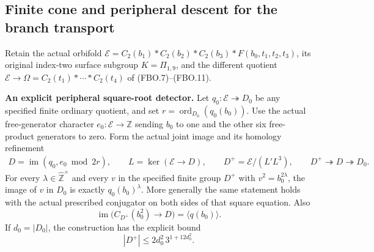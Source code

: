\subsection{Finite cone and peripheral descent for the branch transport}

Retain the actual orbifold
$\mathcal E=C_2(b_1)*C_2(b_2)*C_2(b_3)*
F(b_0,t_1,t_2,t_3)$, its original index-two surface subgroup
$K=\Pi_{1,9}$, and the different quotient
$\mathcal E\to\Omega=C_2(t_1)*\cdots*C_2(t_4)$
of (FBO.7)--(FBO.11).

\par\medskip\noindent\textbf{An explicit peripheral square-root detector.}\quad
Let $q_0:\mathcal E\twoheadrightarrow D_0$ be any specified
finite ordinary quotient, and set
$r=\operatorname{ord}_{D_0}(q_0(b_0))$.
Use the actual free-generator character
$e_0:\mathcal E\to\mathbb Z$ sending $b_0$ to one and the
other six free-product generators to zero.  Form the actual
joint image and its homology refinement
\[
 \begin{gathered}
 D=\operatorname{im}(q_0,e_0\bmod2r),\qquad
 L=\ker(\mathcal E\to D),\qquad
 D^+=\mathcal E/(L'L^3),\qquad D^+\twoheadrightarrow D
                                      \twoheadrightarrow D_0.
 \end{gathered}                                                   \tag{OBT.1}
\]
For every $\lambda\in\widehat{\mathbb Z}^{\times}$ and every
$v$ in the specified finite group $D^+$ with
$v^2=b_0^{2\lambda}$, the image of $v$ in $D_0$ is exactly
$q_0(b_0)^\lambda$.  More generally the same statement holds
with the actual prescribed conjugator on both sides of that
square equation.  Also
\[
 \operatorname{im}\bigl(C_{D^+}(b_0^2)\to D\bigr)
            =\langle q(b_0)\rangle.
                                                               \tag{OBT.2}
\]
If $d_0=|D_0|$, the construction has the explicit bound
\[
             |D^+|\leq 2d_0^2\,3^{1+12d_0^2}.
                                                               \tag{OBT.3}
\]


